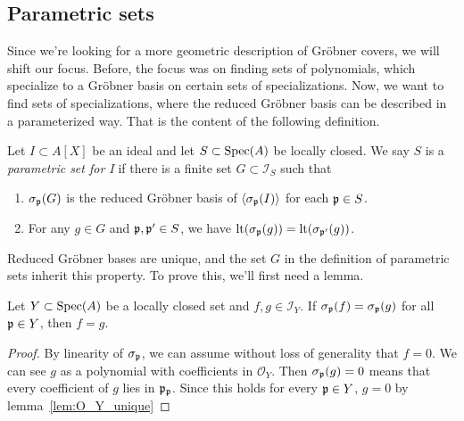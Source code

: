 \subsection{Parametric sets}
Since we're looking for a more geometric description of Gröbner covers, we will shift our focus. Before, the focus was on finding sets of polynomials, which specialize to a Gröbner basis on certain sets of specializations. Now, we want to find sets of specializations, where the reduced Gröbner basis can be described in a parameterized way. That is the content of the following definition.

\begin{definition}
  Let $I \subset A[X]$ be an ideal and let $S \subset \operatorname{Spec}(A)$ be locally closed. We say $S$ is a \textit{parametric set for I} if there is a finite set $G \subset \mathcal I_{S}$ such that
  \begin{enumerate}
    \item $\sigma_{\mathfrak p}(G)$ is the reduced Gröbner basis of $\langle \sigma_{\mathfrak p}(I) \rangle$ for each $\mathfrak p \in S$.
    \item For any $g \in G$ and $\mathfrak p, \mathfrak p' \in S$, we have $\operatorname{lt}(\sigma_{\mathfrak p}(g)) = \operatorname{lt}(\sigma_{\mathfrak p'}(g))$.
  \end{enumerate}
\end{definition}

Reduced Gröbner bases are unique, and the set $G$ in the definition of parametric sets inherit this property. To prove this, we'll first need a lemma.

\begin{lemma}\label{lem:parametric_grb_unique}
  Let $Y \subset \operatorname{Spec}(A)$ be a locally closed set and $f, g \in \mathcal I_{Y}$. If $\sigma_{\mathfrak p}(f) = \sigma_{\mathfrak p}(g)$ for all $\mathfrak p \in Y$, then $f = g$.
\end{lemma}
\begin{proof}
  By linearity of $\sigma_{\mathfrak p}$, we can assume without loss of generality that $f = 0$. We can see $g$ as a polynomial with coefficients in $\mathcal O_{Y}$. Then $\sigma_{\mathfrak p}(g) = 0$ means that every coefficient of $g$ lies in $\mathfrak p_{\mathfrak p}$. Since this holds for every $\mathfrak p \in Y$, $g = 0$ by lemma~\ref{lem:O_Y_unique}
\end{proof}

